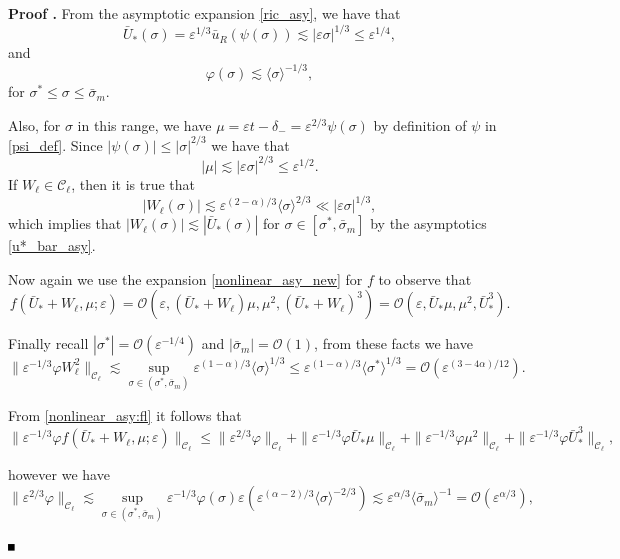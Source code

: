 \documentclass[letterpaper,11pt]{article}
\newcommand{\rmO}{\mathcal{O}}
\newcommand{\eps}{\varepsilon}
\newcommand{\lar}{ \lesssim }
\numberwithin{equation}{section}
\theoremstyle{plain}
\newenvironment{Proof}[1][\unskip]%
 {\begin{trivlist} \item[]{\bf Proof #1. }}%
 {\hspace*{\fill}$\rule{.4\baselineskip}{.4\baselineskip}$\end{trivlist}}
\begin{document}
\begin{Proof}
From the asymptotic expansion \eqref{ric_asy}, we have that
\begin{equation}\label{u*_bar_asy}
\bar{U}_*(\sigma) = \eps^{1/3} \bar{u}_R(\psi(\sigma)) \lar |\eps \sigma|^{1/3}\le \eps^{1/4},
\end{equation}
and
\begin{equation} 
\varphi(\sigma) \lar \langle\sigma\rangle^{-1/3} ,
\end{equation}
for $\sigma^*\le \sigma \le \bar{\sigma}_m$.

Also, for $\sigma$ in this range, we have $\mu = \eps t -\delta_- = \eps^{2/3}\psi(\sigma)$ by definition of $\psi$ in \eqref{psi_def}. Since $|\psi(\sigma)|\le |\sigma|^{2/3}$ we have that 
\[
|\mu| \lar |\eps \sigma|^{2/3} \le \eps^{1/2}.
\]
If $W_\ell \in \mathcal{C}_\ell$, then it is true that
\[
|W_\ell(\sigma)| \lar \eps^{(2-\alpha)/3} \langle \sigma \rangle^{2/3} \ll |\eps\sigma|^{1/3}, 
\]
which implies that $|W_\ell(\sigma)| \lar |\bar{U}_*(\sigma)|$ for $\sigma \in [\sigma^*, \bar{\sigma}_m]$ by the asymptotics \eqref{u*_bar_asy}. 

Now again we use the expansion \eqref{nonlinear_asy_new} for $f$ to observe that 
\begin{equation}\label{nonlinear_asy:fl}
f(\bar{U}_*+W_\ell, \mu ;\eps) = \rmO(\eps, (\bar{U}_*+W_\ell)\mu, \mu^2, (\bar{U}_*+W_\ell)^3 ) = \rmO(\eps, \bar{U}_*\mu, \mu^2, \bar{U}_*^3).
\end{equation}

Finally recall $|\sigma^*| = \rmO(\eps^{-1/4})$ and $|\bar{\sigma}_m| = \rmO(1)$, from these facts we have
\begin{equation}\label{nl_est:Rl_1}
\|\eps^{-1/3}\varphi W_\ell^2\|_{\mathcal{C}_\ell} \lar \sup_{\sigma \in (\sigma^{*},\bar{\sigma}_m)} \eps^{(1-\alpha)/3}\langle \sigma\rangle^{1/3}  \le \eps^{(1-\alpha)/3} \langle \sigma^{*} \rangle^{1/3} = \rmO(\eps^{(3-4\alpha)/12}).
\end{equation}

From \eqref{nonlinear_asy:fl} it follows that
\[
\|\eps^{-1/3}\varphi f(\bar{U}_*+W_\ell, \mu ;\eps)\|_{\mathcal{C}_\ell} \le \|\eps^{2/3}\varphi \|_{\mathcal{C}_\ell} + \|\eps^{-1/3}\varphi \bar{U}_*\mu \|_{\mathcal{C}_\ell}+\|\eps^{-1/3}\varphi \mu^2 \|_{\mathcal{C}_\ell}  + \|\eps^{-1/3}\varphi \bar{U}_*^3 \|_{\mathcal{C}_\ell},
\]

however we have
\[
\|\eps^{2/3}\varphi \|_{\mathcal{C}_\ell} \lar \sup_{\sigma \in (\sigma^{*},\bar{\sigma}_m)} \eps^{-1/3} \varphi(\sigma) \eps (\eps^{(\alpha-2)/3}\langle \sigma\rangle^{-2/3}) \lar \eps^{\alpha/3} \langle\bar{\sigma}_m\rangle^{-1} =\rmO(\eps^{\alpha/3}),
\]


\end{Proof}
\end{document}
